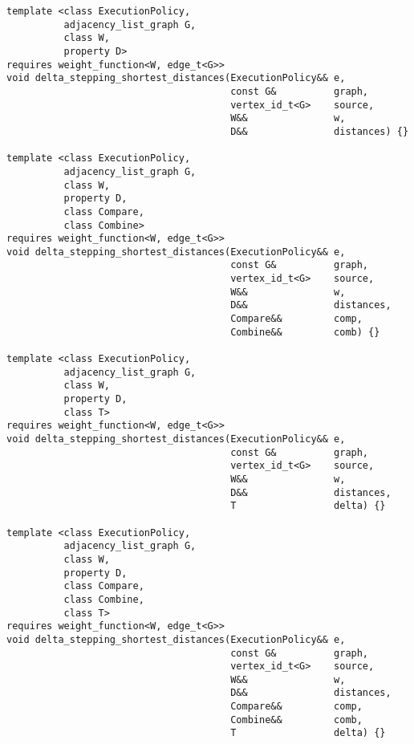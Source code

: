 \begin{lstlisting}
template <class ExecutionPolicy,
          adjacency_list_graph G,
          class W,
          property D>
requires weight_function<W, edge_t<G>>
void delta_stepping_shortest_distances(ExecutionPolicy&& e,
                                       const G&          graph,
                                       vertex_id_t<G>    source,
                                       W&&               w,
                                       D&&               distances) {}

template <class ExecutionPolicy,
          adjacency_list_graph G,
          class W,
          property D,
          class Compare,
          class Combine>
requires weight_function<W, edge_t<G>>
void delta_stepping_shortest_distances(ExecutionPolicy&& e,
                                       const G&          graph,
                                       vertex_id_t<G>    source,
                                       W&&               w,
                                       D&&               distances,
                                       Compare&&         comp,
                                       Combine&&         comb) {}

template <class ExecutionPolicy,
          adjacency_list_graph G,
          class W,
          property D,
          class T>
requires weight_function<W, edge_t<G>>
void delta_stepping_shortest_distances(ExecutionPolicy&& e,
                                       const G&          graph,
                                       vertex_id_t<G>    source,
                                       W&&               w,
                                       D&&               distances,
                                       T                 delta) {}

template <class ExecutionPolicy,
          adjacency_list_graph G,
          class W,
          property D,
          class Compare,
          class Combine,
          class T>
requires weight_function<W, edge_t<G>>
void delta_stepping_shortest_distances(ExecutionPolicy&& e,
                                       const G&          graph,
                                       vertex_id_t<G>    source,
                                       W&&               w,
                                       D&&               distances,
                                       Compare&&         comp,
                                       Combine&&         comb,
                                       T                 delta) {}

\end{lstlisting}

